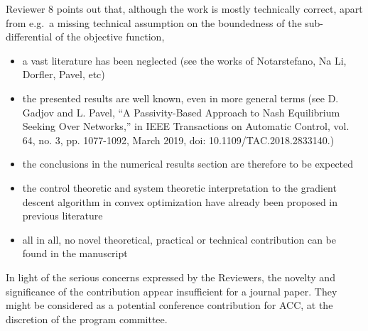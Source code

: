 Reviewer 8 points out that, although the work is mostly technically correct, apart from e.g.\ a missing technical assumption on the boundedness of the sub-differential of the objective function,
\vspace{-7pt}
\begin{itemize}[nosep]
    \item {%
        a vast literature has been neglected (see the works of Notarstefano, Na Li, Dorfler, Pavel, etc)
    }%
    \item{%
        the presented results are well known, even in more general terms (see D. Gadjov and L. Pavel, ``A Passivity-Based Approach to Nash Equilibrium Seeking Over Networks,'' in IEEE Transactions on Automatic Control, vol. 64, no. 3, pp. 1077-1092, March 2019, doi: 10.1109/TAC.2018.2833140.)
    }%
    \item{%
        the conclusions in the numerical results section are therefore to be expected
    }%
    \item{%
        the control theoretic and system theoretic interpretation to the gradient descent algorithm in convex optimization have already been proposed in previous literature
    }%
    \item{%
        all in all, no novel theoretical, practical or technical contribution can be found in the manuscript
    }%
\end{itemize}

In light of the serious concerns expressed by the Reviewers, the novelty and significance of the contribution appear insufficient for a journal paper. They might be considered as a potential conference contribution for ACC, at the discretion of the program committee.
